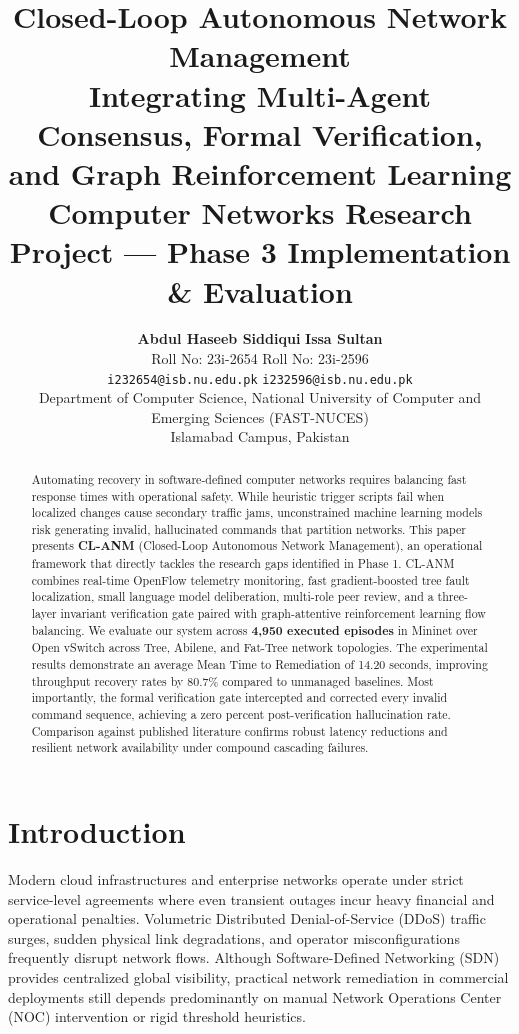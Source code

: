 \documentclass[10pt,twocolumn,a4paper]{article}
\title{
    \vspace{-1.5em}
    \textbf{\LARGE\color{primary} Closed-Loop Autonomous Network Management} \\[0.3em]
    \Large\color{darkgray} Integrating Multi-Agent Consensus, Formal Verification, and Graph Reinforcement Learning \\[0.6em]
    \normalsize\normalfont\color{darkgray} Computer Networks Research Project --- Phase 3 Implementation \& Evaluation
}
\author{
    \textbf{Abdul Haseeb Siddiqui} \quad\quad\quad \textbf{Issa Sultan} \\[0.2em]
    \small Roll No: 23i-2654 \quad\quad\quad\quad\quad\quad\quad\quad Roll No: 23i-2596 \\[0.1em]
    \small \texttt{i232654@isb.nu.edu.pk} \quad\quad\quad \texttt{i232596@isb.nu.edu.pk} \\[0.4em]
    \small Department of Computer Science, National University of Computer and Emerging Sciences (FAST-NUCES) \\
    \small Islamabad Campus, Pakistan
}
\date{}
\begin{document}
\maketitle

\begin{abstract}
Automating recovery in software-defined computer networks requires balancing fast response times with operational safety. While heuristic trigger scripts fail when localized changes cause secondary traffic jams, unconstrained machine learning models risk generating invalid, hallucinated commands that partition networks. This paper presents \textbf{CL-ANM} (Closed-Loop Autonomous Network Management), an operational framework that directly tackles the research gaps identified in Phase 1. CL-ANM combines real-time OpenFlow telemetry monitoring, fast gradient-boosted tree fault localization, small language model deliberation, multi-role peer review, and a three-layer invariant verification gate paired with graph-attentive reinforcement learning flow balancing. We evaluate our system across \textbf{4,950 executed episodes} in Mininet over Open vSwitch across Tree, Abilene, and Fat-Tree network topologies. The experimental results demonstrate an average Mean Time to Remediation of 14.20 seconds, improving throughput recovery rates by 80.7\% compared to unmanaged baselines. Most importantly, the formal verification gate intercepted and corrected every invalid command sequence, achieving a zero percent post-verification hallucination rate. Comparison against published literature confirms robust latency reductions and resilient network availability under compound cascading failures.
\end{abstract}

\vspace{0.8em}

\section{Introduction}
Modern cloud infrastructures and enterprise networks operate under strict service-level agreements where even transient outages incur heavy financial and operational penalties. Volumetric Distributed Denial-of-Service (DDoS) traffic surges, sudden physical link degradations, and operator misconfigurations frequently disrupt network flows. Although Software-Defined Networking (SDN) provides centralized global visibility, practical network remediation in commercial deployments still depends predominantly on manual Network Operations Center (NOC) intervention or rigid threshold heuristics.
\end{document}
